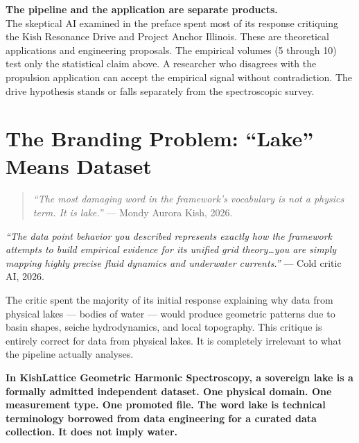 \documentclass[11pt, letterpaper, openany]{book}
\begin{document}
\begin{warningbox}
\textbf{The pipeline and the application are separate products.}\\[0.5em]
The skeptical AI examined in the preface spent most of its response
critiquing the Kish Resonance Drive and Project Anchor Illinois.
These are theoretical applications and engineering proposals.
The empirical volumes (5 through 10) test only the statistical
claim above. A researcher who disagrees with the propulsion
application can accept the empirical signal without contradiction.
The drive hypothesis stands or falls separately from the
spectroscopic survey.
\end{warningbox}

\clearpage
\chapter{The Branding Problem: ``Lake'' Means Dataset}

\begin{quote}
\textit{``The most damaging word in the framework's vocabulary
is not a physics term. It is lake.''} --- Mondy Aurora Kish, 2026.
\end{quote}

\begin{objectionbox}
\textit{``The data point behavior you described represents exactly
how the framework attempts to build empirical evidence for its
unified grid theory\ldots you are simply mapping highly precise
fluid dynamics and underwater currents.''} --- Cold critic AI, 2026.
\end{objectionbox}

The critic spent the majority of its initial response explaining why
data from physical lakes --- bodies of water --- would produce
geometric patterns due to basin shapes, seiche hydrodynamics,
and local topography. This critique is entirely correct for data
from physical lakes. It is completely irrelevant to what the pipeline
actually analyses.

\textbf{In KishLattice Geometric Harmonic Spectroscopy, a sovereign
lake is a formally admitted independent dataset. One physical domain.
One measurement type. One promoted file. The word lake is technical
terminology borrowed from data engineering for a curated data
collection. It does not imply water.}
\end{document}
